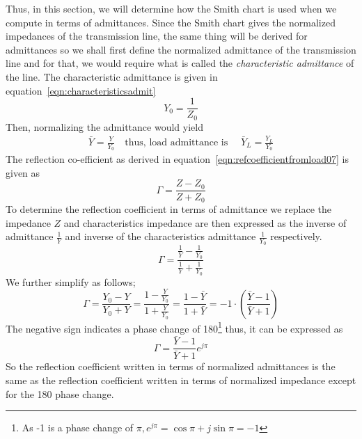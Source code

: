 Thus, in this section, we will determine how the Smith chart is used when we compute in terms of admittances. Since the Smith chart gives the normalized impedances of the transmission line, the same thing will be derived for admittances so we shall first define the normalized admittance of the transmission line and for that, we would require what is called the \emph{characteristic admittance} of the line. The characteristic admittance is given in equation~\eqref{eqn:characteristicsadmit}
\begin{equation}
Y_0 = \frac{1}{Z_0}\label{eqn:characteristicsadmit}
\end{equation}
Then, normalizing the admittance would yield
\begin{align*}
\bar{Y} = \frac{Y}{Y_0}\quad\text{thus, load admittance is }\quad\bar{Y}_L = \frac{Y_L}{Y_0}
\end{align*}
The reflection co-efficient as derived in equation~\eqref{eqn:refcoefficientfromload07} is given as
\begin{equation*}
\Gamma = \frac{Z - Z_0}{Z + Z_0} 
\end{equation*}
To determine the reflection coefficient in terms of admittance we replace the impedance $Z$ and characteristics impedance are then expressed as the inverse of admittance $\frac{1}{Y}$ and inverse of the characteristics admittance $\frac{1}{Y_0}$ respectively.
\begin{equation*}
\Gamma = \frac{\frac{1}{Y} - \frac{1}{Y_0}}{\frac{1}{Y} + \frac{1}{Y_0}}
\end{equation*}
We further simplify as follows;
\begin{dmath*}
\Gamma = \frac{Y_0 - Y}{Y_0 + Y}
= \frac{1 - \frac{Y}{Y_0}}{1 + \frac{Y}{Y_0}}
= \frac{1 - \bar{Y}}{1 + \bar{Y}} = -1\cdot\left(\frac{\bar{Y} - 1}{\bar{Y} + 1}\right)
\end{dmath*}
The negative sign indicates a phase change of 180\textdegree\footnote{
As -1 is a phase change of $\pi, e^{j\pi} = \cos\pi + j\sin\pi = -1$
} thus, it can be expressed as
\begin{equation}
\Gamma = \frac{\bar{Y} - 1}{\bar{Y} + 1}e^{j\pi}
\end{equation}
So the reflection coefficient written in terms of normalized admittances is the same as the reflection coefficient written in terms of normalized impedance except for the 180\textdegree\; phase change.

